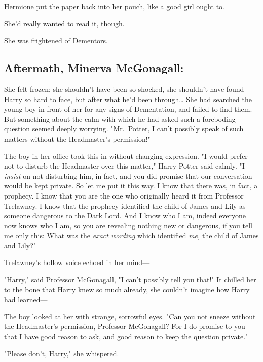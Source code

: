 Hermione put the paper back into her pouch, like a good girl ought to.

She'd really wanted to read it, though.

She was frightened of Dementors.
\sbreak
\vspace{-2\baselineskip}
\subsection{Aftermath, Minerva McGonagall:}

She felt frozen; she shouldn't have been so shocked, she shouldn't have found 
Harry so hard to face, but after what he'd been through{\ldots} She had 
searched the young boy in front of her for any signs of Dementation, and failed 
to find them. But something about the calm with which he had asked such a 
foreboding question seemed deeply worrying. "Mr.~Potter, I can't possibly speak 
of such matters without the Headmaster's permission!"

The boy in her office took this in without changing expression. "I would prefer 
not to disturb the Headmaster over this matter," Harry Potter said calmly. "I 
\emph{insist} on not disturbing him, in fact, and you did promise that our 
conversation would be kept private. So let me put it this way. I know that 
there was, in fact, a prophecy. I know that you are the one who originally 
heard it from Professor Trelawney. I know that the prophecy identified the 
child of James and Lily as someone dangerous to the Dark Lord. And I know who I 
am, indeed everyone now knows who I am, so you are revealing nothing new or 
dangerous, if you tell me only this: What was the \emph{exact wording} which 
identified \emph{me,} the child of James and Lily?"

Trelawney's hollow voice echoed in her mind---


"Harry," said Professor McGonagall, "I can't possibly tell you that!" It 
chilled her to the bone that Harry knew so much already, she couldn't imagine 
how Harry had learned---

The boy looked at her with strange, sorrowful eyes. "Can you not sneeze without 
the Headmaster's permission, Professor McGonagall? For I do promise to you that 
I have good reason to ask, and good reason to keep the question private."

"Please don't, Harry," she whispered.

